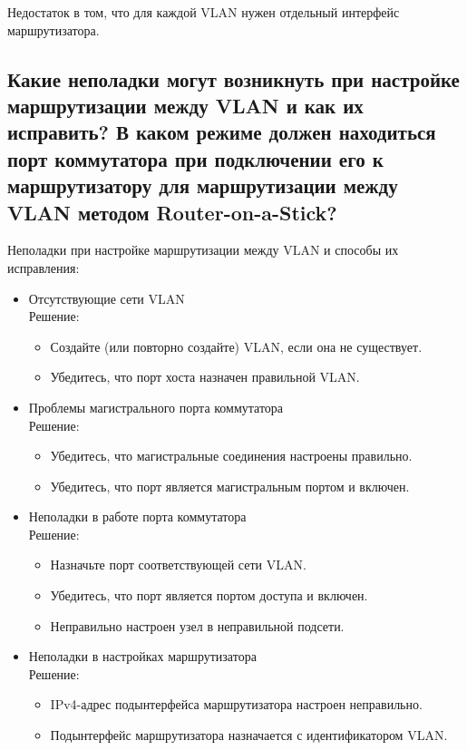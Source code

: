 Недостаток в том, что для каждой VLAN нужен отдельный интерфейс 
маршрутизатора.

\subsection{Какие неполадки могут возникнуть при настройке 
	маршрутизации между VLAN и как их исправить? В каком 
	режиме должен находиться порт коммутатора при подключении 
	его к маршрутизатору для маршрутизации между VLAN 
	методом Router-on-a-Stick?}

Неполадки при настройке маршрутизации между VLAN и способы их 
исправления:
\begin{itemize}
	\item Отсутствующие сети VLAN\\
		Решение:
		\begin{itemize}
			\item Создайте (или повторно создайте) VLAN,
				если она не существует.
			\item Убедитесь, что порт хоста назначен правильной VLAN.
		\end{itemize}
	\item Проблемы магистрального порта коммутатора\\
		Решение:
		\begin{itemize}
			\item Убедитесь, что магистральные соединения настроены правильно.
			\item Убедитесь, что порт является магистральным портом и включен.
		\end{itemize}
	\item Неполадки в работе порта коммутатора\\
		Решение:
		\begin{itemize}
			\item Назначьте порт соответствующей сети VLAN.
			\item Убедитесь, что порт является портом доступа и включен.
			\item Неправильно настроен узел в неправильной подсети.
		\end{itemize}
	\item Неполадки в настройках маршрутизатора\\
		Решение:
		\begin{itemize}
			\item IPv4-адрес подынтерфейса маршрутизатора настроен 
				неправильно.
			\item Подынтерфейс маршрутизатора назначается
				с идентификатором VLAN.
		\end{itemize}
\end{itemize}

